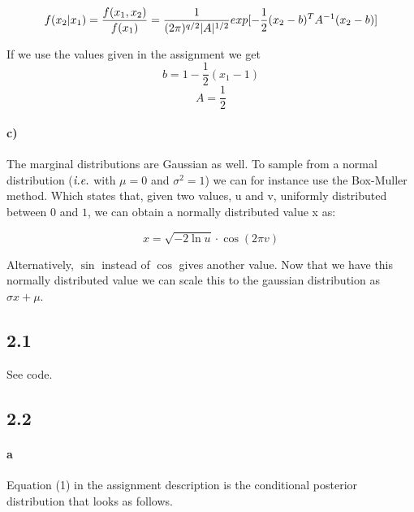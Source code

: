 \documentclass{article}
\begin{document}
$$f(x_2|x_1) = \frac{f(x_1,x_2)}{f(x_1)} \\ 
= \frac{1}{(2\pi)^{q/2}|A|^{1/2}}exp[-\frac{1}{2}(x_2-b)^TA^{-1}(x_2 - b)]$$

If we use the values given in the assignment we get
$$ b = 1 -\frac{1}{2}(x_1 - 1) $$
$$ A = \frac{1}{2}$$ 




\paragraph{c)}

The marginal distributions are Gaussian as well. To sample from a normal
distribution ($\emph{i.e.}$ with $\mu = 0$ and $\sigma^2 = 1$) we can for
instance use the Box-Muller method. Which states that, given two values, u and
v, uniformly distributed between $0$ and $1$, we can obtain a normally
distributed value x as:

\begin{equation}
  x = \sqrt{-2 \ln u } \cdot \cos \left(2 \pi v \right)
\end{equation}

Alternatively, $\sin$ instead of $\cos$ gives another value. \newline
Now that we have this normally distributed value we can scale this to the
gaussian distribution as $\sigma x + \mu$.

\subsection*{2.1}

See code.

\subsection*{2.2}

\paragraph{a}

Equation (1) in the assignment description is the conditional posterior
distribution that looks as follows.
\end{document}

